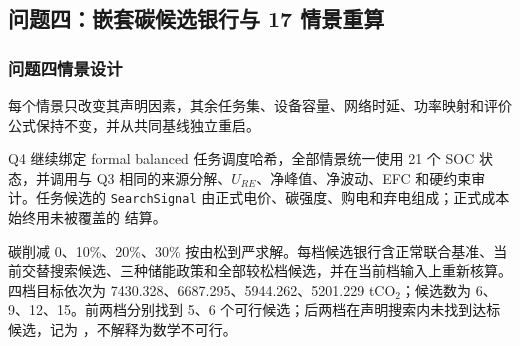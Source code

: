\documentclass[withoutpreface,bwprint]{cumcmthesis}
\begin{document}
\subsection{问题四：嵌套碳候选银行与 17 情景重算}
\subsubsection{问题四情景设计}
每个情景只改变其声明因素，其余任务集、设备容量、网络时延、功率映射和评价公式保持不变，并从共同基线独立重启。

Q4 继续绑定 formal balanced 任务调度哈希，全部情景统一使用 21 个 SOC 状态，并调用与 Q3 相同的来源分解、$U_{RE}$、净峰值、净波动、EFC 和硬约束审计。任务候选的 \texttt{SearchSignal} 由正式电价、碳强度、购电和弃电组成；正式成本始终用未被覆盖的  结算。

碳削减 0、10\%、20\%、30\% 按由松到严求解。每档候选银行含正常联合基准、当前交替搜索候选、三种储能政策和全部较松档候选，并在当前档输入上重新核算。四档目标依次为 7430.328、6687.295、5944.262、5201.229 tCO$_2$；候选数为 6、9、12、15。前两档分别找到 5、6 个可行候选；后两档在声明搜索内未找到达标候选，记为 ，不解释为数学不可行。
\end{document}
